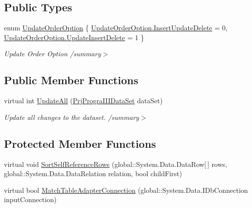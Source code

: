 \subsection*{Public Types}
\begin{DoxyCompactItemize}
\item 
enum \hyperlink{classprj_progra_i_i_i_1_1_prj_progra_i_i_i_data_set_table_adapters_1_1_table_adapter_manager_ada8b937dd32f0e82f86deb1a45b384a6}{Update\+Order\+Option} \{ \hyperlink{classprj_progra_i_i_i_1_1_prj_progra_i_i_i_data_set_table_adapters_1_1_table_adapter_manager_ada8b937dd32f0e82f86deb1a45b384a6a27b77cb15d3da7ded0250d0001bc6755}{Update\+Order\+Option.\+Insert\+Update\+Delete} = 0, 
\hyperlink{classprj_progra_i_i_i_1_1_prj_progra_i_i_i_data_set_table_adapters_1_1_table_adapter_manager_ada8b937dd32f0e82f86deb1a45b384a6a894fcc001e51f673d3fb5f3096473dd8}{Update\+Order\+Option.\+Update\+Insert\+Delete} = 1
 \}\begin{DoxyCompactList}\small\item\em Update Order Option /summary$>$ \end{DoxyCompactList}
\end{DoxyCompactItemize}
\subsection*{Public Member Functions}
\begin{DoxyCompactItemize}
\item 
virtual int \hyperlink{classprj_progra_i_i_i_1_1_prj_progra_i_i_i_data_set_table_adapters_1_1_table_adapter_manager_afa01f84fa5f134c63c7eb3e08a8da05d}{Update\+All} (\hyperlink{classprj_progra_i_i_i_1_1_prj_progra_i_i_i_data_set}{Prj\+Progra\+I\+I\+I\+Data\+Set} data\+Set)
\begin{DoxyCompactList}\small\item\em Update all changes to the dataset. /summary$>$ \end{DoxyCompactList}\end{DoxyCompactItemize}
\subsection*{Protected Member Functions}
\begin{DoxyCompactItemize}
\item 
virtual void \hyperlink{classprj_progra_i_i_i_1_1_prj_progra_i_i_i_data_set_table_adapters_1_1_table_adapter_manager_acc9e867d0c21719f04a2d4c6f2d21fdd}{Sort\+Self\+Reference\+Rows} (global\+::\+System.\+Data.\+Data\+Row\mbox{[}$\,$\mbox{]} rows, global\+::\+System.\+Data.\+Data\+Relation relation, bool child\+First)
\item 
virtual bool \hyperlink{classprj_progra_i_i_i_1_1_prj_progra_i_i_i_data_set_table_adapters_1_1_table_adapter_manager_abc4a149066f1153ecb0e994b879e4c5b}{Match\+Table\+Adapter\+Connection} (global\+::\+System.\+Data.\+I\+Db\+Connection input\+Connection)
\end{DoxyCompactItemize}
